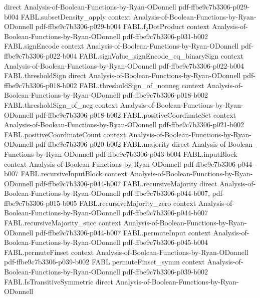 \begin{theorem}
  {direct}
  {Analysis-of-Boolean-Functions-by-Ryan-ODonnell}
  {pdf-ffbe9c7b3306-p029-b004}
\proofstep
  {FABL.subsetDensity_apply}
  {context}
  {Analysis-of-Boolean-Functions-by-Ryan-ODonnell}
  {pdf-ffbe9c7b3306-p029-b004}
\proofstep
  {FABL.f₂DotProduct}
  {context}
  {Analysis-of-Boolean-Functions-by-Ryan-ODonnell}
  {pdf-ffbe9c7b3306-p031-b002}
\proofstep
  {FABL.signEncode}
  {context}
  {Analysis-of-Boolean-Functions-by-Ryan-ODonnell}
  {pdf-ffbe9c7b3306-p022-b004}
\proofstep
  {FABL.signValue_signEncode_eq_binarySign}
  {context}
  {Analysis-of-Boolean-Functions-by-Ryan-ODonnell}
  {pdf-ffbe9c7b3306-p022-b004}
\proofstep
  {FABL.thresholdSign}
  {direct}
  {Analysis-of-Boolean-Functions-by-Ryan-ODonnell}
  {pdf-ffbe9c7b3306-p018-b002}
\proofstep
  {FABL.thresholdSign_of_nonneg}
  {context}
  {Analysis-of-Boolean-Functions-by-Ryan-ODonnell}
  {pdf-ffbe9c7b3306-p018-b002}
\proofstep
  {FABL.thresholdSign_of_neg}
  {context}
  {Analysis-of-Boolean-Functions-by-Ryan-ODonnell}
  {pdf-ffbe9c7b3306-p018-b002}
\proofstep
  {FABL.positiveCoordinateSet}
  {context}
  {Analysis-of-Boolean-Functions-by-Ryan-ODonnell}
  {pdf-ffbe9c7b3306-p021-b002}
\proofstep
  {FABL.positiveCoordinateCount}
  {context}
  {Analysis-of-Boolean-Functions-by-Ryan-ODonnell}
  {pdf-ffbe9c7b3306-p020-b002}
\proofstep
  {FABL.majority}
  {direct}
  {Analysis-of-Boolean-Functions-by-Ryan-ODonnell}
  {pdf-ffbe9c7b3306-p043-b004}
\proofstep
  {FABL.inputBlock}
  {context}
  {Analysis-of-Boolean-Functions-by-Ryan-ODonnell}
  {pdf-ffbe9c7b3306-p044-b007}
\proofstep
  {FABL.recursiveInputBlock}
  {context}
  {Analysis-of-Boolean-Functions-by-Ryan-ODonnell}
  {pdf-ffbe9c7b3306-p044-b007}
\proofstep
  {FABL.recursiveMajority}
  {direct}
  {Analysis-of-Boolean-Functions-by-Ryan-ODonnell}
  {pdf-ffbe9c7b3306-p044-b007,
    pdf-ffbe9c7b3306-p015-b005}
\proofstep
  {FABL.recursiveMajority_zero}
  {context}
  {Analysis-of-Boolean-Functions-by-Ryan-ODonnell}
  {pdf-ffbe9c7b3306-p044-b007}
\proofstep
  {FABL.recursiveMajority_succ}
  {context}
  {Analysis-of-Boolean-Functions-by-Ryan-ODonnell}
  {pdf-ffbe9c7b3306-p044-b007}
\proofstep
  {FABL.permuteInput}
  {context}
  {Analysis-of-Boolean-Functions-by-Ryan-ODonnell}
  {pdf-ffbe9c7b3306-p045-b004}
\proofstep
  {FABL.permuteFinset}
  {context}
  {Analysis-of-Boolean-Functions-by-Ryan-ODonnell}
  {pdf-ffbe9c7b3306-p039-b002}
\proofstep
  {FABL.permuteFinset_symm}
  {context}
  {Analysis-of-Boolean-Functions-by-Ryan-ODonnell}
  {pdf-ffbe9c7b3306-p039-b002}
\proofstep
  {FABL.IsTransitiveSymmetric}
  {direct}
  {Analysis-of-Boolean-Functions-by-Ryan-ODonnell}

\end{theorem}
